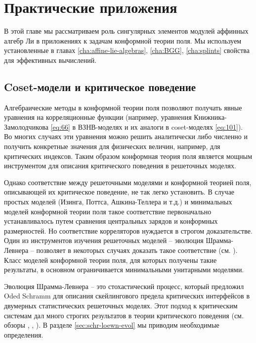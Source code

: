 \chapter{Практические приложения}
\label{cha:applications}

В этой главе мы рассматриваем роль сингулярных элементов модулей аффинных алгебр Ли в приложениях к задачам конформной теории поля. Мы используем установленные в главах \ref{cha:affine-lie-algebras}, \ref{cha:BGG}, \ref{cha:splints} свойства для эффективных вычислений. 

\section{Coset-модели и критическое поведение}

\label{sec:SLE}

Алгебраические методы в конформной теории поля позволяют получать явные уравнения на корреляционные функции (например, уравнения Книжника-Замолодчикова \eqref{eq:66} в ВЗНВ-моделях и их аналоги в coset-моделях \eqref{eq:101}). Во многих случаях эти уравнения можно решить аналитически либо численно и получить конкретные значения для физических величин, например, для критических индексов. Таким образом конформная теория поля является мощным инструментом для описания критического поведения в решеточных моделях. 

Однако соответствие между решеточными моделями и конформной теорией поля, описывающей их критическое поведение, не так легко установить. В случае простых моделей (Изинга, Поттса, Ашкина-Теллера и т.д.) и минимальных моделей конформной теории поля такое соответствие первоначально устанавливалось путем сравнения центральных зарядов и конформных размерностей. Но соответствие корреляторов нуждается в строгом доказательстве. Один из инструментов изучения решеточных моделей -- эволюция Шрамма-Левнера -- позволяет в некоторых случаях доказать такое соответствие (см. \cite{duminil2011conformal,chelkak2009universality,smirnov2007towards,smirnov2001critical,Cardy:2005kh,bauer2004conformal,bauer2004sle,bauer2004cfts,bauer2003sle,friedrich2003conformal,bauer2002sle}). Класс моделей конформной теории поля, для которых получены такие результаты, в основном ограничивается минимальными унитарными моделями. 

Эволюция Шрамма-Левнера -- это стохастический процесс, который предложил Oded Schramm  \cite{schramm2000scaling} для описания скейлингового предела критических интерфейсов в двумерных статистических решеточных моделях. Этот подход к критическим системам дал много строгих результатов в теории критического поведения (см. обзоры  \cite{rohde2005basic}, \cite{bauer20062d}, \cite{Cardy:2005kh}). В разделе \ref{sec:schr-loewn-evol} мы приводим необходимые определения.  

